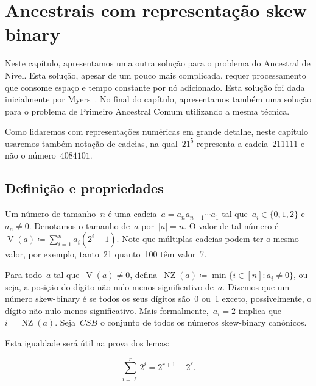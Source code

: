\documentclass[main.tex]{subfiles}
\begin{document}
\providecommand{\Par}{\operatorname{Parent}}
\newcommand{\LA}{\operatorname{LA}}
\newcommand{\Dep}{\operatorname{D}}
\newcommand{\LCA}{\operatorname{LCA}}

\newcommand{\NZ}{\operatorname{NZ}}
\newcommand{\CSB}{\textit{CSB}}
\renewcommand{\V}{\operatorname{V}}
\newcommand{\R}{\operatorname{R}}
\newcommand{\J}{\operatorname{J}}

\chapter{Ancestrais com representação skew binary} \label{cap:skew}

Neste capítulo, apresentamos uma outra solução para o problema do Ancestral de Nível. Esta solução, apesar de um pouco mais complicada, requer processamento que consome espaço e tempo constante por nó adicionado. Esta solução foi dada inicialmente por Myers~\cite{Myers83}. No final do capítulo, apresentamos também uma solução para o problema de Primeiro Ancestral Comum utilizando a mesma técnica.

Como lidaremos com representações numéricas em grande detalhe, neste capítulo usaremos também notação de cadeias, na qual~$21^5$ representa a cadeia~$211111$ e não o número~$4084101$.

\section{Definição e propriedades}

Um número  de tamanho~$n$ é uma cadeia~${a = a_n a_{n-1} \cdots a_1}$ tal que~${a_i \in \{0, 1, 2\}}$ e~$a_n \neq 0$. Denotamos o tamanho de~$a$ por~$|a| = n$. O valor de tal número é~${\V(a) \coloneqq \sum\limits_{i = 1}^n{a_i (2^i - 1)}}$. Note que múltiplas cadeias podem ter o mesmo valor, por exemplo, tanto~21 quanto~100 têm valor~7.

Para todo~$a$ tal que~$\V(a) \neq 0$, defina~$\NZ(a) \coloneqq \min\{i \in [n] : a_i \neq 0\}$, ou seja, a posição do dígito não nulo menos significativo de~$a$. Dizemos que um número skew-binary é  se todos os seus dígitos são~0 ou~1 exceto, possivelmente, o dígito não nulo menos significativo. Mais formalmente,~${a_i = 2}$ implica que ${i = \NZ(a)}$. Seja~$\CSB$ o conjunto de todos os números skew-binary canônicos.

Esta igualdade será útil na prova dos lemas:

\begin{equation} \tag{A} \label{eq:sum2}
	\sum\limits_{i = \ell}^r{2^i} = 2^{r+1} - 2^{\ell}.
\end{equation}
\end{document}
